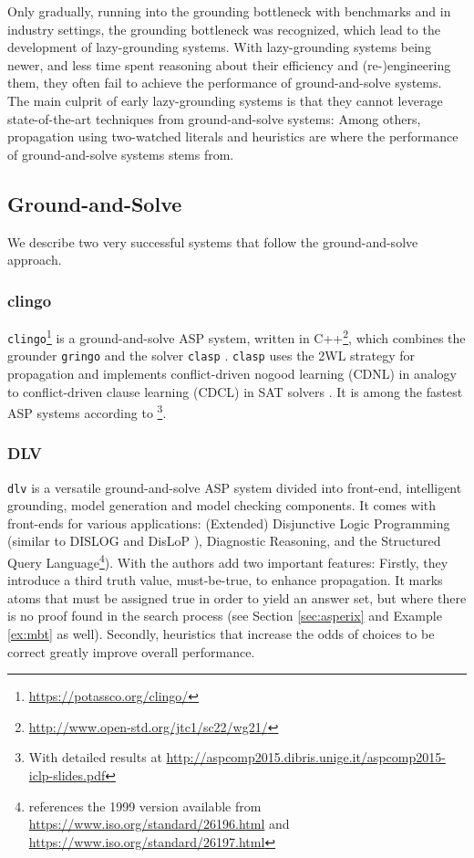 \documentclass{vutinfth} %
\newcommand{\mbt}{must-be-true\xspace}
\newcommand{\clasp}{\texttt{clasp}\xspace}
\newcommand{\dlv}{\texttt{dlv}\xspace}
\begin{document}
Only gradually, running into the grounding bottleneck with benchmarks and in industry settings, the grounding bottleneck was recognized, which lead to the development of lazy-grounding systems. With lazy-grounding systems being newer, and less time spent reasoning about their efficiency and (re-)engineering them, they often fail to achieve the performance of ground-and-solve systems. The main culprit of early lazy-grounding systems is that they cannot leverage state-of-the-art techniques from ground-and-solve systems: Among others, propagation using two-watched literals and heuristics are where the performance of ground-and-solve systems stems from.

\subsection{Ground-and-Solve}

We describe two very successful systems that follow the ground-and-solve approach.

\subsubsection{clingo}

\texttt{clingo}\footnote{\url{https://potassco.org/clingo/}} is a ground-and-solve ASP system, written in C++\footnote{\url{http://www.open-std.org/jtc1/sc22/wg21/}}, which combines the grounder \texttt{gringo} and the solver \texttt{clasp} \cite{clasp-first}. \clasp uses the 2WL strategy for propagation \cite[Sec.~5.3]{clasp} and implements conflict-driven nogood learning (CDNL) \cite[Sec.~4.1]{clasp} in analogy to conflict-driven clause learning (CDCL) in SAT solvers \cite{grasp,cdl-sat}. It is among the fastest ASP systems according to \cite{aspcomp2015}\footnote{With detailed results at \url{http://aspcomp2015.dibris.unige.it/aspcomp2015-iclp-slides.pdf}}.

\subsubsection{DLV}
\label{sec:dlv}

\dlv \cite{dlv} is a versatile ground-and-solve ASP system divided into front-end, intelligent grounding, model generation and model checking components. It comes with front-ends for various applications: (Extended) Disjunctive Logic Programming \cite{dlp} (similar to DISLOG \cite{dislog} and DisLoP \cite{dislop}), Diagnostic Reasoning, and the Structured Query Language\footnote{\cite{dlv} references the 1999 version available from \url{https://www.iso.org/standard/26196.html} and \url{https://www.iso.org/standard/26197.html}}). With \cite{dlv-mbt} the authors add two important features: Firstly, they introduce a third truth value, \mbt, to enhance propagation. It marks atoms that must be assigned true in order to yield an answer set, but where there is no proof found in the search process (see Section \ref{sec:asperix} and Example \ref{ex:mbt} as well). Secondly, heuristics that increase the odds of choices to be correct greatly improve overall performance.
\end{document}
